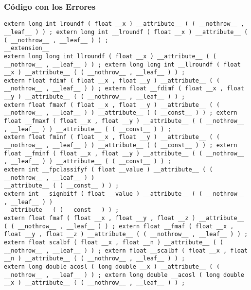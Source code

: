 \documentclass{beamer}
\begin{document}
\begin{frame}[fragile]
\frametitle{C\'odigo con los Errores}
\begin{verbatim}
extern long int lroundf ( float __x ) __attribute__ ( ( __nothrow__ , __leaf__ ) ) ; extern long int __lroundf ( float __x ) __attribute__ ( ( __nothrow__ , __leaf__ ) ) ; 
__extension__ 
extern long long int llroundf ( float __x ) __attribute__ ( ( __nothrow__ , __leaf__ ) ) ; extern long long int __llroundf ( float __x ) __attribute__ ( ( __nothrow__ , __leaf__ ) ) ; 
extern float fdimf ( float __x , float __y ) __attribute__ ( ( __nothrow__ , __leaf__ ) ) ; extern float __fdimf ( float __x , float __y ) __attribute__ ( ( __nothrow__ , __leaf__ ) ) ; 
extern float fmaxf ( float __x , float __y ) __attribute__ ( ( __nothrow__ , __leaf__ ) ) __attribute__ ( ( __const__ ) ) ; extern float __fmaxf ( float __x , float __y ) __attribute__ ( ( __nothrow__ , __leaf__ ) ) __attribute__ ( ( __const__ ) ) ; 
extern float fminf ( float __x , float __y ) __attribute__ ( ( __nothrow__ , __leaf__ ) ) __attribute__ ( ( __const__ ) ) ; extern float __fminf ( float __x , float __y ) __attribute__ ( ( __nothrow__ , __leaf__ ) ) __attribute__ ( ( __const__ ) ) ; 
extern int __fpclassifyf ( float __value ) __attribute__ ( ( __nothrow__ , __leaf__ ) ) 
__attribute__ ( ( __const__ ) ) ; 
extern int __signbitf ( float __value ) __attribute__ ( ( __nothrow__ , __leaf__ ) ) 
__attribute__ ( ( __const__ ) ) ; 
extern float fmaf ( float __x , float __y , float __z ) __attribute__ ( ( __nothrow__ , __leaf__ ) ) ; extern float __fmaf ( float __x , float __y , float __z ) __attribute__ ( ( __nothrow__ , __leaf__ ) ) ; 
extern float scalbf ( float __x , float __n ) __attribute__ ( ( __nothrow__ , __leaf__ ) ) ; extern float __scalbf ( float __x , float __n ) __attribute__ ( ( __nothrow__ , __leaf__ ) ) ; 
extern long double acosl ( long double __x ) __attribute__ ( ( __nothrow__ , __leaf__ ) ) ; extern long double __acosl ( long double __x ) __attribute__ ( ( __nothrow__ , __leaf__ ) ) ; 
\end{verbatim}
\end{frame}
\end{document}
